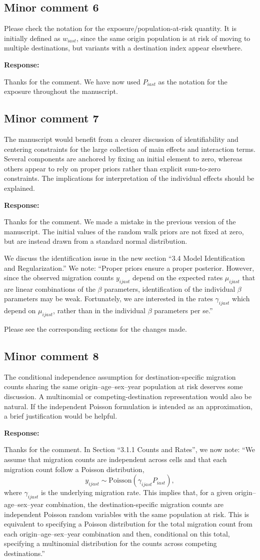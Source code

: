 \documentclass[11pt,a4paper]{article}
\newlength{\replyspace}
\newenvironment{response}{\par\addvspace{\replyspace}\nopagebreak\textbf{\textcolor{replyblue}{Response:}}\par\begingroup\color{replyblue}}{\par\endgroup\vspace{\replyspace}}
\newcommand{\refcomment}[2]{\par\Needspace{5\baselineskip}\subsection*{#1}#2\par}
\begin{document}
\refcomment{Minor comment 6}{
Please check the notation for the exposure/population-at-risk quantity. It is initially defined as $w_{iast}$, since the same origin population is at risk of moving to multiple destinations, but variants with a destination index appear elsewhere.
}
\begin{response}
Thanks for the comment. We have now used $P_{iast}$ as the notation for the exposure throughout the manuscript.
\end{response}

\refcomment{Minor comment 7}{
The manuscript would benefit from a clearer discussion of identifiability and centering constraints for the large collection of main effects and interaction terms. Several components are anchored by fixing an initial element to zero, whereas others appear to rely on proper priors rather than explicit sum-to-zero constraints. The implications for interpretation of the individual effects should be explained.
}
\begin{response}
Thanks for the comment. We made a mistake in the previous version of the manuscript.  The initial values of the random walk priors are not fixed at zero, but are instead drawn from a standard normal distribution.

We discuss the identification issue in the new section ``3.4 Model Identification and Regularization.'' We note: ``Proper priors ensure a proper posterior. However, since the observed migration counts $y_{ijast}$ depend on the expected rates $\mu_{ijast}$  that are linear combinations of the $\beta$ parameters,  identification of the individual $\beta$ parameters may be weak.  Fortunately, we are interested in the rates $\gamma_{ijast}$ which depend on $\mu_{ijast}$, rather than in the individual $\beta$ parameters per se.''

Please see the corresponding sections for the changes made.
\end{response}

\refcomment{Minor comment 8}{
The conditional independence assumption for destination-specific migration counts sharing the same origin--age--sex--year population at risk deserves some discussion. A multinomial or competing-destination representation would also be natural. If the independent Poisson formulation is intended as an approximation, a brief justification would be helpful.
}
\begin{response}
Thanks for the comment.  In Section ``3.1.1 Counts and Rates'', we now note: ``We assume that migration counts are independent across cells and that each migration count follow a Poisson distribution,
$$y_{ijast}\sim\text{Poisson}(\gamma_{ijast}P_{iast}),$$
where $\gamma_{ijast}$ is the underlying migration rate. This implies that, for a given origin–age–sex–year combination, the destination-specific migration counts are independent Poisson random variables with the same population at risk. This is equivalent to specifying a Poisson distribution for the total migration count from each origin–age–sex–year combination and then, conditional on this total, specifying a multinomial distribution for the counts across competing destinations.''

\end{response}
\end{document}
